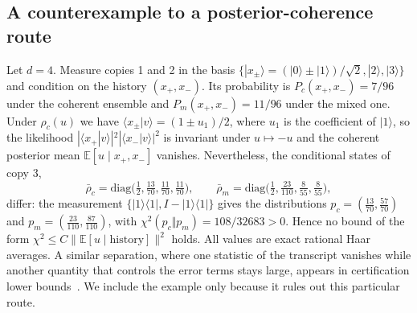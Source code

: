 \documentclass[pdflatex,sn-mathphys-num]{sn-jnl}%
\theoremstyle{thmstyleone}
\theoremstyle{thmstylethree}
\theoremstyle{thmstyletwo}
\newcommand{\E}{\mathbb{E}}
\newcommand{\ket}[1]{|#1\rangle}
\newcommand{\bra}[1]{\langle #1|}
\begin{document}
\begin{appendices}

\section{A counterexample to a posterior-coherence route}\label{app:posterior}

Let $d=4$. Measure copies 1 and 2 in the basis $\{\ket{x_\pm}=(\ket0\pm\ket1)/\sqrt2,\ket2,\ket3\}$ and condition on
the history $(x_+,x_-)$. Its probability is $P_c(x_+,x_-)=7/96$ under the coherent ensemble and $P_m(x_+,x_-)=11/96$
under the mixed one. Under $\rho_c(u)$ we have $\langle x_\pm|v\rangle=(1\pm u_1)/2$, where $u_1$ is the coefficient of
$\ket1$, so the likelihood $|\langle x_+|v\rangle|^2|\langle x_-|v\rangle|^2$ is invariant under $u\mapsto-u$ and the
coherent posterior mean $\E[u\mid x_+,x_-]$ vanishes. Nevertheless, the conditional states of copy 3,
\[
\bar\rho_c=\mathrm{diag}\bigl(\tfrac12,\tfrac{13}{70},\tfrac{11}{70},\tfrac{11}{70}\bigr),\qquad
\bar\rho_m=\mathrm{diag}\bigl(\tfrac12,\tfrac{23}{110},\tfrac8{55},\tfrac8{55}\bigr),
\]
differ: the measurement $\{\ket1\bra1,I-\ket1\bra1\}$ gives the distributions $p_c=(\tfrac{13}{70},\tfrac{57}{70})$ and
$p_m=(\tfrac{23}{110},\tfrac{87}{110})$, with $\chi^2(p_c\Vert p_m)=108/32683>0$. Hence no bound of the form
$\chi^2\le C\|\E[u\mid\text{history}]\|^2$ holds. All values are exact rational Haar averages. A similar separation, where one statistic
of the transcript vanishes while another quantity that controls the error terms stays large, appears in certification
lower bounds~\cite[App.~D]{chll}. We include the example only because it rules out this particular route.

\end{appendices}
\end{document}
